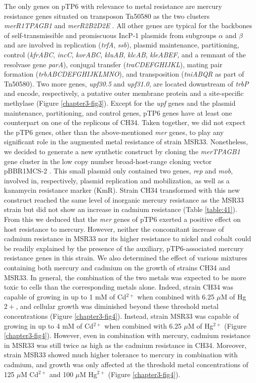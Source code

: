 The only genes on pTP6 with relevance to metal resistance are mercury resistance genes situated on transposon Tn50580 as the two clusters \textit{merR1TPAGB1} and \textit{merR2B2D2E} \citep{smalla2006increased}. All other genes are typical for the backbones of self-transmissible and promiscuous IncP-1 plasmids from subgroups $\alpha$ and $\beta$ and are involved in replication (\textit{trfA}, \textit{ssb}), plasmid maintenance, partitioning, control (\textit{kfrABC}, \textit{incC}, \textit{korABC}, \textit{kluAB}, \textit{klcAB}, \textit{kleABEF}, and a remnant of the resolvase gene \textit{parA}), conjugal transfer (\textit{traCDEFGHIJKL}), mating pair formation (\textit{trbABCDEFGHIJKLMNO}), and transposition (\textit{tniABQR} as part of Tn50580). Two more genes, \textit{upf30.5} and \textit{upf31.0}, are located downstream of \textit{trbP} and encode, respectively, a putative outer membrane protein and a site-specific methylase (Figure \ref{chapter3-fig3}). Except for the \textit{upf} genes and the plasmid maintenance, partitioning, and control genes, pTP6 genes have at least one counterpart on one of the replicons of CH34. Taken together, we did not expect the pTP6 genes, other than the above-mentioned \textit{mer} genes, to play any significant role in the augmented metal resistance of strain MSR33. Nonetheless, we decided to generate a new synthetic construct by cloning the \textit{merTPAGB1} gene cluster in the low copy number broad-host-range cloning vector pBBR1MCS-2 \citep{kovach1995four}. This small plasmid only contained two genes, \textit{rep} and \textit{mob}, involved in, respectively, plasmid replication and mobilization, as well as a kanamycin resistance marker (KmR). Strain CH34 transformed with this new construct reached the same level of inorganic mercury resistance as the MSR33 strain but did not show an increase in cadmium resistance (Table \ref{table:41}). From this we deduced that the \textit{mer} genes of pTP6 exerted a positive effect on host resistance to mercury. However, neither the concomitant increase of cadmium resistance in MSR33 nor its higher resistance to nickel and cobalt could be readily explained by the presence of the auxiliary, pTP6-associated mercury resistance genes in this strain.
We also determined the effect of various mixtures containing both mercury and cadmium on the growth of strains CH34 and MSR33. In general, the combination of the two metals was expected to be more toxic to cells than the corresponding metals alone. Indeed, strain CH34 was capable of growing in up to 1 mM of Cd$^{2+}$ when combined with 6.25 $\mu$M of Hg${2+}$, and cellular growth was diminished beyond these threshold metal concentrations (Figure \ref{chapter3-fig4}). Instead, strain MSR33 was capable of growing in up to 4 mM of Cd$^{2+}$ when combined with 6.25 $\mu$M of Hg$^{2+}$ (Figure \ref{chapter3-fig4}). However, even in combination with mercury, cadmium resistance in MSR33 was still twice as high as the cadmium resistance in CH34. Moreover, strain MSR33 showed much higher tolerance to mercury in combination with cadmium, and growth was only affected at the threshold metal concentrations of 125 $\mu$M Cd$^{2+}$ and 100 $\mu$M Hg$^{2+}$ (Figure \ref{chapter3-fig4}).
